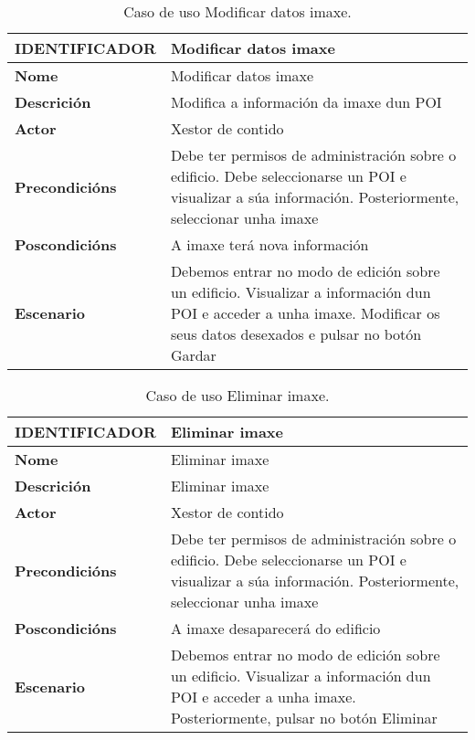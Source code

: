 \begin{table}[tbh]
	\footnotesize
	\centering
	\begin{tabular}{|l|p{10cm}|}
		\hline 
		\textbf{IDENTIFICADOR}	& \textbf{Modificar datos imaxe} \\ 
		\hline 
		\textbf{Nome} & Modificar datos imaxe \\ 
		\hline 
		\textbf{Descrición} & Modifica a información da imaxe dun POI \\ 
		\hline 
		\textbf{Actor} & Xestor de contido \\ 
		\hline 
		\textbf{Precondicións} & Debe ter permisos de administración sobre o edificio. Debe seleccionarse un POI e visualizar a súa información. Posteriormente, seleccionar unha imaxe \\ 
		\hline 
		\textbf{Poscondicións} & A imaxe terá nova información \\ 
		\hline 
		\textbf{Escenario} & Debemos entrar no modo de edición sobre un edificio. Visualizar a información dun POI e acceder a unha imaxe. Modificar os seus datos desexados e pulsar no botón Gardar \\ 
		\hline 
	\end{tabular}
	\caption{Caso de uso Modificar datos imaxe.}
	\label{tab:cuModificarImaxe}
\end{table}

\begin{table}[tbh]
	\footnotesize
	\centering
	\begin{tabular}{|l|p{10cm}|}
		\hline 
		\textbf{IDENTIFICADOR}	& \textbf{Eliminar imaxe} \\ 
		\hline 
		\textbf{Nome} & Eliminar imaxe \\ 
		\hline 
		\textbf{Descrición} & Eliminar imaxe \\ 
		\hline 
		\textbf{Actor} & Xestor de contido \\ 
		\hline 
		\textbf{Precondicións} & Debe ter permisos de administración sobre o edificio. Debe seleccionarse un POI e visualizar a súa información. Posteriormente, seleccionar unha imaxe \\ 
		\hline 
		\textbf{Poscondicións} & A imaxe desaparecerá do edificio \\ 
		\hline 
		\textbf{Escenario} & Debemos entrar no modo de edición sobre un edificio. Visualizar a información dun POI e acceder a unha imaxe. Posteriormente, pulsar no botón Eliminar \\ 
		\hline 
	\end{tabular}
	\caption{Caso de uso Eliminar imaxe.}
	\label{tab:cuEliminarImaxe}
\end{table}

